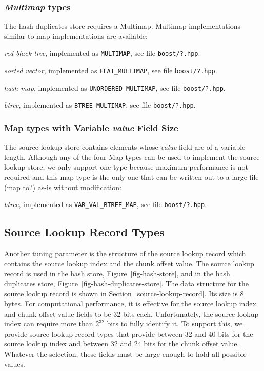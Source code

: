 \documentclass[12pt,twoside]{article}
\begin{document}
\subsubsection{\emph{Multimap} types\label{tuning-multimap-type}}
The hash duplicates store requires a Multimap.
Multimap implementations similar to map implementations are available:
\begin{compactitem}
\item \emph{red-black tree}, implemented as \texttt{MULTIMAP}, see file \texttt{boost/?.hpp}.
\item \emph{sorted vector}, implemented as \texttt{FLAT\_MULTIMAP}, see file \texttt{boost/?.hpp}.
\item \emph{hash map}, implemented as \texttt{UNORDERED\_MULTIMAP}, see file \texttt{boost/?.hpp}.
\item \emph{btree}, implemented as \texttt{BTREE\_MULTIMAP}, see file \texttt{boost/?.hpp}.
\end{compactitem}

\subsubsection{Map types with Variable \emph{value} Field Size}
The source lookup store
contains elements whose \emph{value} field are of a variable length.
Although any of the four Map types can be used to implement the source lookup store,
we only support one type because
maximum performance is not required
and this map type is the only one that can be written out to a large file (map to?)
as-is without modification:
\begin{compactitem}
\item \emph{btree}, implemented as \texttt{VAR\_VAL\_BTREE\_MAP}, see file \texttt{boost/?.hpp}.
\end{compactitem}

\subsection{Source Lookup Record Types\label{tuning-source-lookup-record-type}}
Another tuning parameter is the structure of the source lookup record
which contains the source lookup index and the chunk offset value.
The source lookup record is used in the hash store, Figure~\ref{fig-hash-store},
and in the hash duplicates store, Figure~\ref{fig-hash-duplicates-store}.
The data structure for the source lookup record is shown in Section~\ref{source-lookup-record}.
Its size is 8 bytes.
For computational performance,
it is effective for the source lookup index and chunk offset value fields
to be 32 bits each.
Unfortunately, the source lookup index can require more than \begin{math}2^{32}\end{math} bits
to fully identify it.
To support this, we provide source lookup record types that provide
between 32 and 40 bits for the source lookup index
and between 32 and 24 bits for the chunk offset value.
Whatever the selection, these fields must be large enough to hold all possible values.
\end{document}
